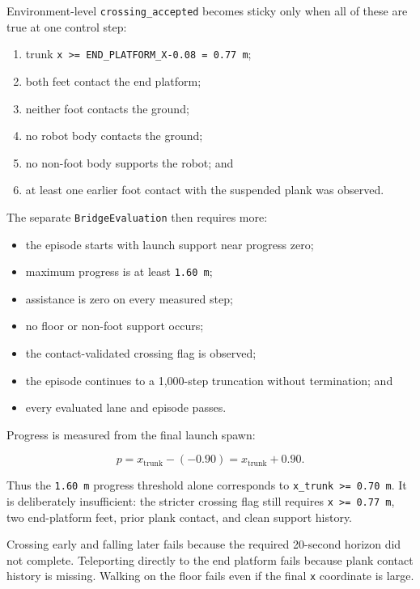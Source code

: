 \documentclass[
  american,
  11pt,
  letterpaper,
]{article}
\providecommand{\tightlist}{%
  \setlength{\itemsep}{0pt}\setlength{\parskip}{0pt}}
\begin{document}
Environment-level
\texttt{crossing\allowbreak{}\_\allowbreak{}accepted\allowbreak{}}
becomes sticky only when all of these are true at one control step:

\begin{enumerate}
\def\labelenumi{\arabic{enumi}.}
\tightlist
\item
  trunk \texttt{x\ \textgreater{}=\ END\_PLATFORM\_X-0.08\ =\ 0.77\ m};
\item
  both feet contact the end platform;
\item
  neither foot contacts the ground;
\item
  no robot body contacts the ground;
\item
  no non-foot body supports the robot; and
\item
  at least one earlier foot contact with the suspended plank was
  observed.
\end{enumerate}

The separate \texttt{BridgeEv\allowbreak{}aluation\allowbreak{}} then
requires more:

\begin{itemize}
\tightlist
\item
  the episode starts with launch support near progress zero;
\item
  maximum progress is at least \texttt{1.60\ m};
\item
  assistance is zero on every measured step;
\item
  no floor or non-foot support occurs;
\item
  the contact-validated crossing flag is observed;
\item
  the episode continues to a 1,000-step truncation without termination;
  and
\item
  every evaluated lane and episode passes.
\end{itemize}

Progress is measured from the final launch spawn:

\[
p=x_{\text{trunk}}-(-0.90)=x_{\text{trunk}}+0.90.
\]

Thus the \texttt{1.60\ m} progress threshold alone corresponds to
\texttt{x\_trunk\ \textgreater{}=\ 0.70\ m}. It is deliberately
insufficient: the stricter crossing flag still requires
\texttt{x\ \textgreater{}=\ 0.77\ m}, two end-platform feet, prior plank
contact, and clean support history.

Crossing early and falling later fails because the required 20-second
horizon did not complete. Teleporting directly to the end platform fails
because plank contact history is missing. Walking on the floor fails
even if the final \texttt{x} coordinate is large.
\end{document}
